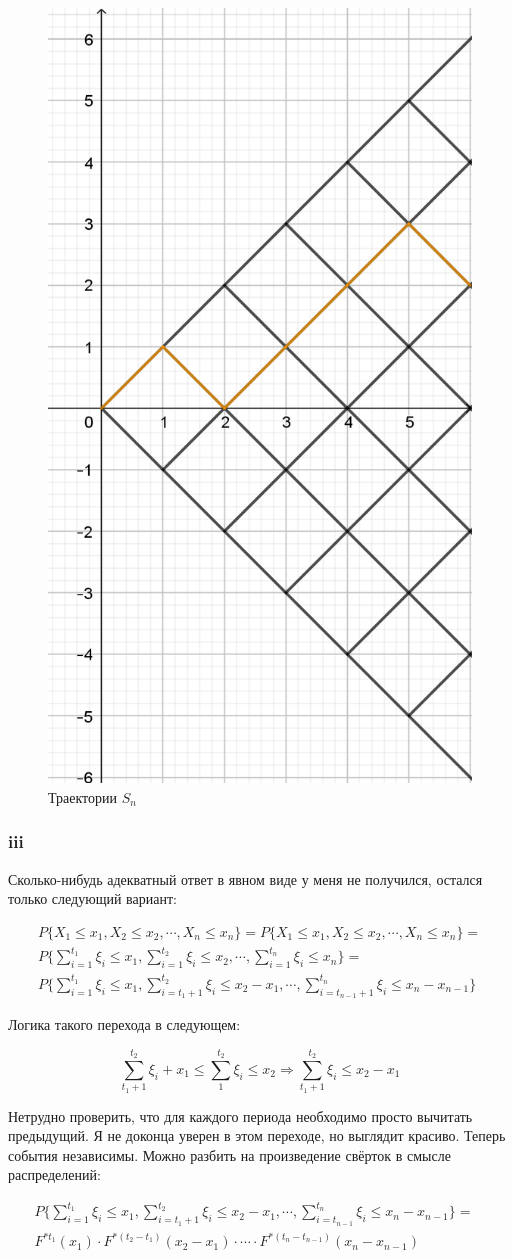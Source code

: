 \documentclass[a4paper,12pt]{article}
\begin{document}
\begin{figure}[h]
	\includegraphics[width=0.3\linewidth]{14}
	\caption{Траектории $ S_n $}
	\label{rombs}
\end{figure}
\subsubsection{iii}

Сколько-нибудь адекватный ответ в явном виде у меня не получился, остался только следующий вариант:

\begin{equation*}
\begin{aligned}
P\{  X_1 \le x_1, X_2 \le x_2, \cdots, X_n \le x_n \}  = P\{  X_1 \le x_1, X_2 \le x_2, \cdots, X_n \le x_n \} =\\
P\{  \sum_{i = 1}^{t_1}\xi_i \le x_1, \sum_{i = 1}^{t_2}\xi_i \le x_2, \cdots, \sum_{i = 1}^{t_n}\xi_i \le x_n \} = \\ P\{  \sum_{i = 1}^{t_1}\xi_i \le x_1, \sum_{i = t_1 + 1}^{t_2}\xi_i \le x_2 - x_1, \cdots, \sum_{i = t_{n-1}+1}^{t_n}\xi_i \le x_n - x_{n-1} \}
\end{aligned}
\end{equation*}




Логика такого перехода в следующем:

\[ \sum_{t_1 + 1}^{t_2}\xi_i + x_1 \le \sum_{1}^{t_2} \xi_i \le x_2 \Rightarrow \sum_{t_1 + 1}^{t_2} \xi_i \le x_2 - x_1\]

Нетрудно проверить, что для каждого периода необходимо просто вычитать предыдущий. Я не доконца уверен в этом переходе, но выглядит красиво. Теперь события независимы. Можно разбить на произведение свёрток в смысле распределений:


\begin{equation*}
\begin{aligned}
 P\{  \sum_{i = 1}^{t_1}\xi_i \le x_1, \sum_{i = t_1 + 1}^{t_2}\xi_i \le x_2 - x_1, \cdots, \sum_{i = t_{n-1}}^{t_n}\xi_i \le x_n - x_{n-1}\} =&\\ F^{*t_1}(x_1) \cdot F^{*(t_2 - t_1)}(x_2 - x_1) \cdot \cdots \cdot F^{*(t_n - t_{n-1})}(x_n - x_{n-1})
\end{aligned}
\end{equation*}
\end{document}
